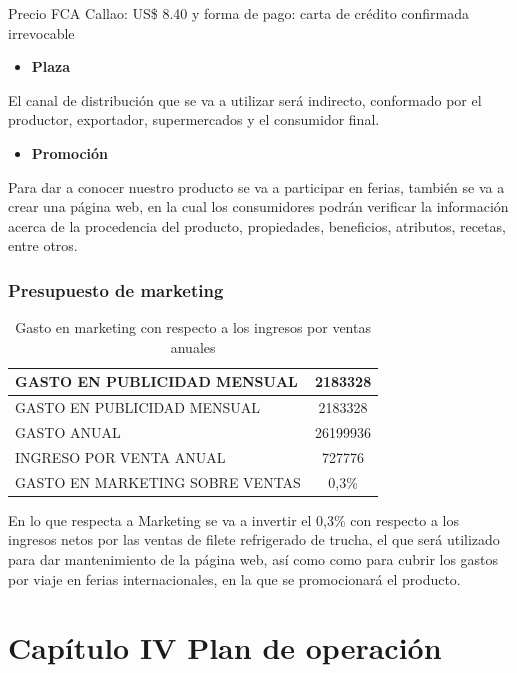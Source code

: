 \documentclass[
  stu,
  floatsintext,
  longtable,
  a4paper,
  nolmodern,
  notxfonts,
  notimes,
  colorlinks=true,linkcolor=blue,citecolor=blue,urlcolor=blue]{apa7}
\providecommand{\tightlist}{%
  \setlength{\itemsep}{0pt}\setlength{\parskip}{0pt}}
\begin{document}
Precio FCA Callao: US\$ 8.40 y forma de pago: carta de crédito
confirmada irrevocable

\begin{itemize}
\tightlist
\item
  \hspace{0pt} \textbf{Plaza}
\end{itemize}

El canal de distribución que se va a utilizar será indirecto, conformado
por el productor, exportador, supermercados y el consumidor final.

\begin{itemize}
\tightlist
\item
  \hspace{0pt} \textbf{Promoción}
\end{itemize}

Para dar a conocer nuestro producto se va a participar en ferias,
también se va a crear una página web, en la cual los consumidores podrán
verificar la información acerca de la procedencia del producto,
propiedades, beneficios, atributos, recetas, entre otros.

\subsubsection{Presupuesto de marketing}\label{presupuesto-de-marketing}

\begin{longtable}[]{@{}lc@{}}
\caption{Gasto en marketing con respecto a los ingresos por ventas
anuales}\tabularnewline
\toprule\noalign{}
GASTO EN PUBLICIDAD MENSUAL & 2183328 \\
\midrule\noalign{}
\endfirsthead
\toprule\noalign{}
GASTO EN PUBLICIDAD MENSUAL & 2183328 \\
\midrule\noalign{}
\endhead
\bottomrule\noalign{}
\endlastfoot
GASTO ANUAL & 26199936 \\
INGRESO POR VENTA ANUAL & 727776 \\
GASTO EN MARKETING SOBRE VENTAS & 0,3\% \\
\end{longtable}

En lo que respecta a Marketing se va a invertir el 0,3\% con respecto a
los ingresos netos por las ventas de filete refrigerado de trucha, el
que será utilizado para dar mantenimiento de la página web, así como
como para cubrir los gastos por viaje en ferias internacionales, en la
que se promocionará el producto.

\section{Capítulo IV Plan de
operación}\label{capuxedtulo-iv-plan-de-operaciuxf3n}
\end{document}
